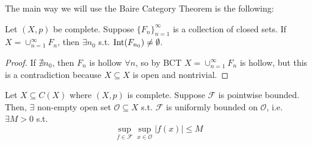 The main way we will use the Baire Category Theorem is the following:
\begin{cor}
    Let $(X, p)$ be complete. Suppose $\{F_{n}\}_{n=1}^{\infty} $ is a collection of closed sets.
    If $X = \cup_{n=1}^{\infty} F_n$, then $\exists n_0$ s.t. $\operatorname{Int}(F_{n_0}) \neq \emptyset$.   

\end{cor}
\begin{proof}
    If $\nexists n_0$, then $F_n$ is hollow $\forall n$, so by BCT $X = \cup_{n =1}^{\infty} F_n$
    is hollow, but this is a contradiction because $X \subseteq X$ is open and nontrivial.     
\end{proof} 

\begin{thm}
    Let $X \subseteq C(X)$ where $(X, p)$ is complete. Suppose $\mathcal{F}$ is pointwise bounded. 
    Then, $\exists $ non-empty open set $\mathcal{O} \subseteq X$ s.t. $\mathcal{F}$ is uniformly
    bounded on $\mathcal{O}$, i.e. $\exists M > 0$ s.t. \[
        \sup_{f \in \mathcal{F}} \sup_{x \in \mathcal{O}} \left|  f(x) \right| \leq M
    \] 
\end{thm}

